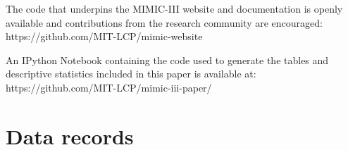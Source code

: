 \documentclass[english]{article}
\begin{document}
The code that underpins the MIMIC-III website and documentation is openly available and contributions from the research community are encouraged: \\ https://github.com/MIT-LCP/mimic-website

An IPython Notebook containing the code used to generate the tables and descriptive statistics included in this paper is available at: \\ https://github.com/MIT-LCP/mimic-iii-paper/


\section*{Data records}



\end{document}

